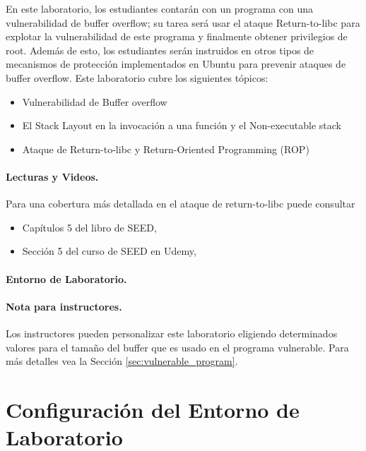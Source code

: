 En este laboratorio, los estudiantes contarán con un programa con una vulnerabilidad de buffer overflow; su tarea será usar el ataque Return-to-libc para explotar la vulnerabilidad de este programa y finalmente obtener privilegios de root.
Además de esto, los estudiantes serán instruidos en otros tipos de mecanismos de protección implementados en Ubuntu para prevenir ataques de buffer overflow.
Este laboratorio cubre los siguientes tópicos:

\begin{itemize}[noitemsep]
\item Vulnerabilidad de Buffer overflow
\item El Stack Layout en la invocación a una función y el Non-executable stack 
\item Ataque de Return-to-libc y Return-Oriented Programming (ROP)
\end{itemize}


\paragraph{Lecturas y Videos.}
Para una cobertura más detallada en el ataque de return-to-libc puede consultar

\begin{itemize}
\item Capítulos 5 del libro de SEED, \seedbook
\item Sección 5 del curso de SEED en Udemy, \seedcsvideo
\end{itemize}


\paragraph{Entorno de Laboratorio.} \seedenvironmentC


\paragraph{Nota para instructores.}
Los instructores pueden personalizar este laboratorio eligiendo determinados valores para el tamaño del buffer que es usado en el programa vulnerable.
Para más detalles vea la Sección \ref{sec:vulnerable_program}.


\section{Configuración del Entorno de Laboratorio}


